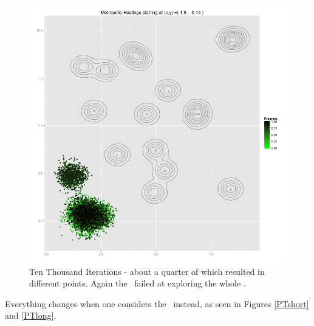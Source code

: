 \begin{figure}[ht]
	\centering 
	\includegraphics[width=\textwidth,keepaspectratio]{./img/MH_simululation_10000_steps.png}
	\caption{Ten Thousand Iterations - about a quarter of which resulted in different points. Again the \MH\, failed at exploring the whole \sspace.}\label{unexploredLong}
\end{figure}

Everything changes when one considers the \PT\, instead, as seen in Figures \ref{PTshort} and \ref{PTlong}.

